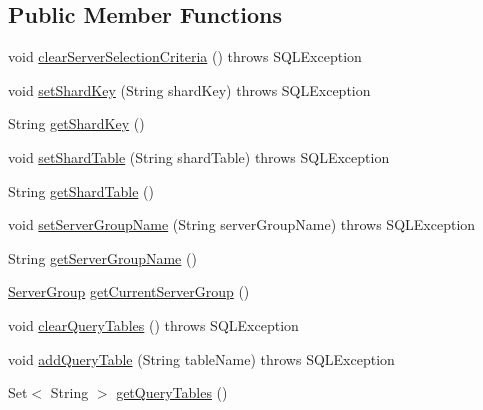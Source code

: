 \subsection*{Public Member Functions}
\begin{DoxyCompactItemize}
\item 
void \mbox{\hyperlink{interfacecom_1_1mysql_1_1fabric_1_1jdbc_1_1_j_d_b_c4_fabric_my_s_q_l_connection_a4e94ec09f3572a85d101436c73f31639}{clear\+Server\+Selection\+Criteria}} ()  throws S\+Q\+L\+Exception
\item 
void \mbox{\hyperlink{interfacecom_1_1mysql_1_1fabric_1_1jdbc_1_1_j_d_b_c4_fabric_my_s_q_l_connection_a31d07bbd8d6d4b0f11aa3a2821c7a67c}{set\+Shard\+Key}} (String shard\+Key)  throws S\+Q\+L\+Exception
\item 
String \mbox{\hyperlink{interfacecom_1_1mysql_1_1fabric_1_1jdbc_1_1_j_d_b_c4_fabric_my_s_q_l_connection_afdb3537208ceee1dc4bb1eed37291e51}{get\+Shard\+Key}} ()
\item 
void \mbox{\hyperlink{interfacecom_1_1mysql_1_1fabric_1_1jdbc_1_1_j_d_b_c4_fabric_my_s_q_l_connection_a7085c352cf3be84de89c7a9bedb30b71}{set\+Shard\+Table}} (String shard\+Table)  throws S\+Q\+L\+Exception
\item 
String \mbox{\hyperlink{interfacecom_1_1mysql_1_1fabric_1_1jdbc_1_1_j_d_b_c4_fabric_my_s_q_l_connection_a01cfb76801198b8a05ea88da69f1e19a}{get\+Shard\+Table}} ()
\item 
void \mbox{\hyperlink{interfacecom_1_1mysql_1_1fabric_1_1jdbc_1_1_j_d_b_c4_fabric_my_s_q_l_connection_afca01f9903ebe1302682407c53bcc5fe}{set\+Server\+Group\+Name}} (String server\+Group\+Name)  throws S\+Q\+L\+Exception
\item 
String \mbox{\hyperlink{interfacecom_1_1mysql_1_1fabric_1_1jdbc_1_1_j_d_b_c4_fabric_my_s_q_l_connection_ae0f32bcdffd52eddb6973610b64cb52f}{get\+Server\+Group\+Name}} ()
\item 
\mbox{\hyperlink{classcom_1_1mysql_1_1fabric_1_1_server_group}{Server\+Group}} \mbox{\hyperlink{interfacecom_1_1mysql_1_1fabric_1_1jdbc_1_1_j_d_b_c4_fabric_my_s_q_l_connection_a280c9141d5eedc8db7d318ae4e1f4923}{get\+Current\+Server\+Group}} ()
\item 
void \mbox{\hyperlink{interfacecom_1_1mysql_1_1fabric_1_1jdbc_1_1_j_d_b_c4_fabric_my_s_q_l_connection_aee3d5de1c11f5a298d25be03d9d5e4da}{clear\+Query\+Tables}} ()  throws S\+Q\+L\+Exception
\item 
void \mbox{\hyperlink{interfacecom_1_1mysql_1_1fabric_1_1jdbc_1_1_j_d_b_c4_fabric_my_s_q_l_connection_ade96f0e780c3cca879d7d1662505dcd6}{add\+Query\+Table}} (String table\+Name)  throws S\+Q\+L\+Exception
\item 
Set$<$ String $>$ \mbox{\hyperlink{interfacecom_1_1mysql_1_1fabric_1_1jdbc_1_1_j_d_b_c4_fabric_my_s_q_l_connection_a47bbd4e6bba1ba51c977c2575952d376}{get\+Query\+Tables}} ()
\end{DoxyCompactItemize}


